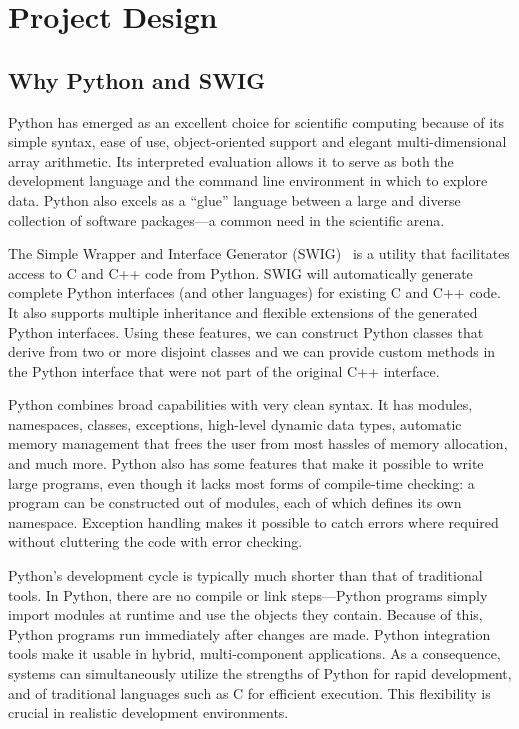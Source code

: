 \documentclass[acmtocl]{acmtrans2m}
\begin{document}
\section{Project Design}
\label{sec:design}

\subsection{Why Python and SWIG}
\label{sec:why}

Python has emerged as an excellent choice for scientific computing
because of its simple syntax, ease of use, object-oriented support and
elegant multi-dimensional array arithmetic.  Its interpreted
evaluation allows it to serve as both the development language and the
command line environment in which to explore data.  Python also excels
as a ``glue'' language between a large and diverse collection of
software packages---a common need in the scientific arena.

The Simple Wrapper and Interface Generator (SWIG)~\cite{swig} is a
utility that facilitates access to C and C++ code from Python. SWIG
will automatically generate complete Python interfaces (and other
languages) for existing C and C++ code.  It also supports multiple
inheritance and flexible extensions of the generated Python
interfaces.  Using these features, we can construct Python classes
that derive from two or more disjoint classes and we can provide
custom methods in the Python interface that were not part of the
original C++ interface.

Python combines broad capabilities with very clean syntax.  It has
modules, namespaces, classes, exceptions, high-level dynamic data
types, automatic memory management that frees the user from most
hassles of memory allocation, and much more.  Python also has some
features that make it possible to write large programs, even though
it lacks most forms of compile-time checking: a program can be
constructed out of modules, each of which defines its own namespace.
Exception handling makes it possible to catch errors where required
without cluttering the code with error checking.

Python's development cycle is typically much shorter than that of
traditional tools.  In Python, there are no compile or link
steps---Python programs simply import modules at runtime and use the
objects they contain.  Because of this, Python programs run
immediately after changes are made.  Python integration tools make
it usable in hybrid, multi-component applications.  As a
consequence, systems can simultaneously utilize the strengths of
Python for rapid development, and of traditional languages such as C
for efficient execution.  This flexibility is crucial in realistic
development environments.
\end{document}
